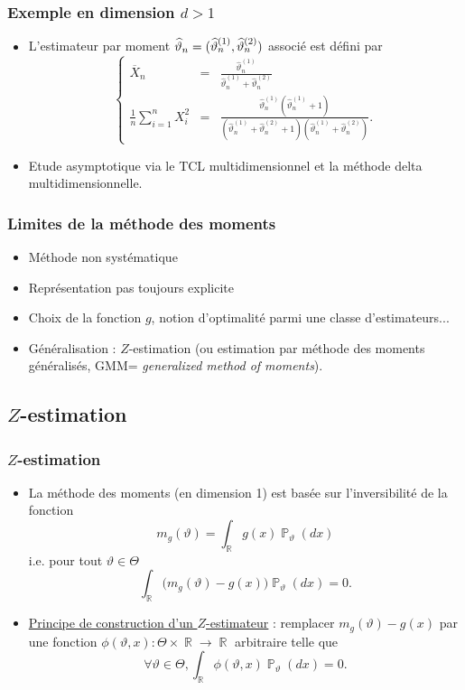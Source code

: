 ﻿\documentclass{beamer}
\DeclareMathOperator{\R}{{\mathbb R}}
\DeclareMathOperator{\PP}{{\mathbb P}}
\DeclareMathOperator{\est}{\widehat \vartheta_{\mathnormal{n}}}
\begin{document}
\begin{frame}
\frametitle{Exemple en dimension $d>1$}
\begin{itemize}
\item {\color{red}L'estimateur par moment} $\est = (\widehat \vartheta_n^{(1)},\widehat \vartheta_n^{(2)})$ associé est défini par
$$
\left\{\begin{array}{cll}
\overline{X}_n & = &\displaystyle \frac{\widehat \vartheta_n^{(1)}}{\widehat \vartheta_n^{(1)}+\widehat \vartheta_n^{(2)}} \\
\frac{1}{n}\sum_{i = 1}^n X_i^2 & = &\displaystyle  \frac{\widehat \vartheta_n^{(1)}(\widehat \vartheta_n^{(1)}+1)}{(\widehat \vartheta_n^{(1)}+\widehat \vartheta_n^{(2)}+1)(\widehat \vartheta_n^{(1)}+\widehat \vartheta_n^{(2)})}.
\end{array}
\right.
$$
\item {\color{red}Etude asymptotique} via le TCL multidimensionnel et la méthode \og delta\fg{} multidimensionnelle.
\end{itemize}
\end{frame}

\begin{frame}
\frametitle{Limites de la méthode des moments}
\begin{itemize}
\item Méthode {\color{red}non systématique}
\item Représentation pas toujours explicite
\item Choix de la fonction $g$, notion d'optimalité parmi une classe d'estimateurs...
\item {\color{red}Généralisation} : $Z$-estimation (ou estimation par méthode
des moments généralisés, GMM= {\it generalized method of moments}).
\end{itemize}
\end{frame}
\subsection{$Z$-estimation}
\begin{frame}
\frametitle{$Z$-estimation}
\begin{itemize}
\item La méthode des moments  (en dimension 1) est basée sur l'inversibilité de la fonction
$$m_g(\vartheta) = \int_{\R} g(x)\PP_\vartheta(dx)$$
i.e. pour tout $\vartheta \in \Theta$
$$\int_{\R}\big(m_g(\vartheta)-g(x)\big)\PP_\vartheta(dx)=0.$$
\item \underline{Principe de construction d'un $Z$-estimateur} :
{\color{red} remplacer} $m_g(\vartheta)-g(x)$ par une fonction $\phi(\vartheta,x):
\Theta \times \R \rightarrow \R$ {\color{red}arbitraire}
telle que
$$\boxed{\forall \vartheta \in \Theta,\int_{\R}\phi(\vartheta, x) \PP_\vartheta(dx)=0.}$$
\end{itemize}
\end{frame}
\end{document}
